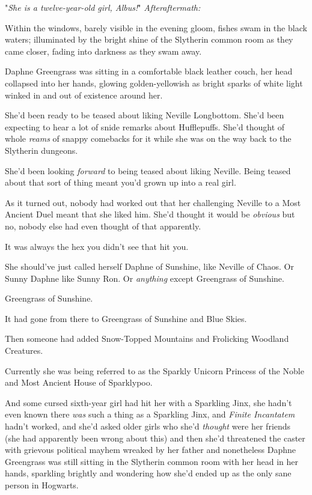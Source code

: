 "\emph{She is a twelve-year-old girl, Albus!}"
\sbreak
\emph{Afteraftermath:}

Within the windows, barely visible in the evening gloom, fishes swam in the 
black waters; illuminated by the bright shine of the Slytherin common room as 
they came closer, fading into darkness as they swam away.

Daphne Greengrass was sitting in a comfortable black leather couch, her head 
collapsed into her hands, glowing golden-yellowish as bright sparks of white 
light winked in and out of existence around her.

She'd been ready to be teased about liking Neville Longbottom. She'd been 
expecting to hear a lot of snide remarks about Hufflepuffs. She'd thought of 
whole \emph{reams} of snappy comebacks for it while she was on the way back to 
the Slytherin dungeons.

She'd been looking \emph{forward} to being teased about liking Neville. Being 
teased about that sort of thing meant you'd grown up into a real girl.

As it turned out, nobody had worked out that her challenging Neville to a Most 
Ancient Duel meant that she liked him. She'd thought it would be \emph{obvious} 
but no, nobody else had even thought of that apparently.

It was always the hex you didn't see that hit you.

She should've just called herself Daphne of Sunshine, like Neville of Chaos. Or 
Sunny Daphne like Sunny Ron. Or \emph{anything} except Greengrass of Sunshine.

Greengrass of Sunshine.

It had gone from there to Greengrass of Sunshine and Blue Skies.

Then someone had added Snow-Topped Mountains and Frolicking Woodland Creatures.

Currently she was being referred to as the Sparkly Unicorn Princess of the 
Noble and Most Ancient House of Sparklypoo.

And some cursed sixth-year girl had hit her with a Sparkling Jinx, she hadn't 
even known there \emph{was} such a thing as a Sparkling Jinx, and \emph{Finite 
Incantatem} hadn't worked, and she'd asked older girls who she'd \emph{thought} 
were her friends (she had apparently been wrong about this) and then she'd 
threatened the caster with grievous political mayhem wreaked by her father and 
nonetheless Daphne Greengrass was still sitting in the Slytherin common room 
with her head in her hands, sparkling brightly and wondering how she'd ended up 
as the only sane person in Hogwarts.


